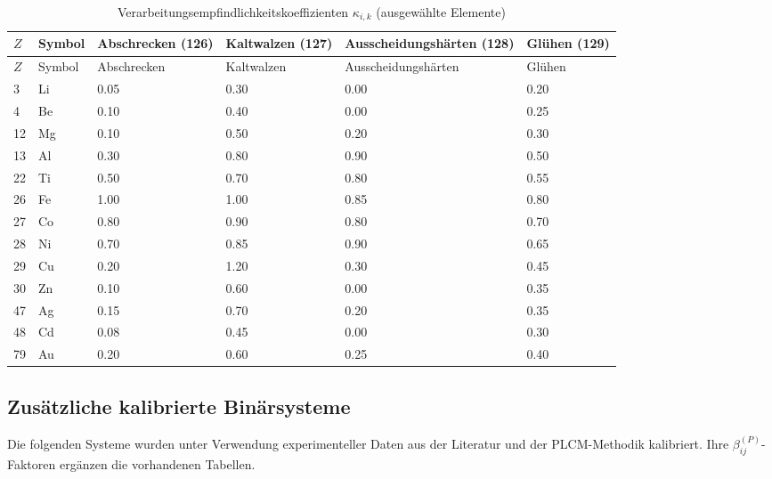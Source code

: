 \documentclass[12pt,a4paper]{article}
\begin{document}
	\begin{longtable}{p{1.8cm} p{1.2cm} p{1.2cm} p{1.2cm} p{1.2cm} p{1.2cm}}
		\caption{Verarbeitungsempfindlichkeitskoeffizienten $\kappa_{i,k}$ (ausgewählte Elemente)}\label{tab:kappa_ik}\\
		\toprule
		$Z$ & Symbol & Abschrecken (126) & Kaltwalzen (127) & Ausscheidungshärten (128) & Glühen (129) \\
		\midrule
		\endfirsthead
		\toprule
		$Z$ & Symbol & Abschrecken & Kaltwalzen & Ausscheidungshärten & Glühen \\
		\midrule
		\endhead
		3  & Li  & 0.05 & 0.30 & 0.00 & 0.20 \\
		4  & Be  & 0.10 & 0.40 & 0.00 & 0.25 \\
		12 & Mg  & 0.10 & 0.50 & 0.20 & 0.30 \\
		13 & Al  & 0.30 & 0.80 & 0.90 & 0.50 \\
		22 & Ti  & 0.50 & 0.70 & 0.80 & 0.55 \\
		26 & Fe  & 1.00 & 1.00 & 0.85 & 0.80 \\
		27 & Co  & 0.80 & 0.90 & 0.80 & 0.70 \\
		28 & Ni  & 0.70 & 0.85 & 0.90 & 0.65 \\
		29 & Cu  & 0.20 & 1.20 & 0.30 & 0.45 \\
		30 & Zn  & 0.10 & 0.60 & 0.00 & 0.35 \\
		47 & Ag  & 0.15 & 0.70 & 0.20 & 0.35 \\
		48 & Cd  & 0.08 & 0.45 & 0.00 & 0.30 \\
		79 & Au  & 0.20 & 0.60 & 0.25 & 0.40 \\
		\bottomrule
	\end{longtable}
	
	
	\subsection*{Zusätzliche kalibrierte Binärsysteme}
	
	Die folgenden Systeme wurden unter Verwendung experimenteller Daten aus der Literatur und der PLCM-Methodik kalibriert. Ihre $\beta_{ij}^{(P)}$-Faktoren ergänzen die vorhandenen Tabellen.
	
\end{document}
